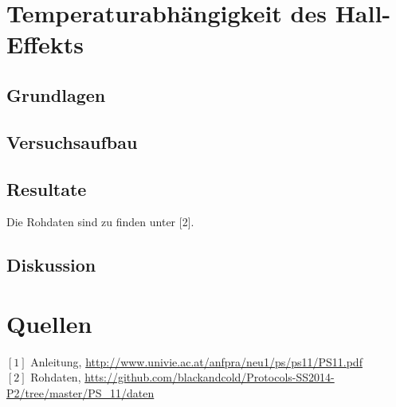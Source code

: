 \documentclass[12pt,a4paper]{article}
\begin{document}
\begin{multicols}{2}
\section{Temperaturabhängigkeit des Hall-Effekts}

\subsection{Grundlagen}

\subsection{Versuchsaufbau}

\subsection{Resultate}


 




\noindent Die Rohdaten sind zu finden unter [2].

\subsection{Diskussion}


\section{Quellen}
$[1]$ Anleitung, \url{http://www.univie.ac.at/anfpra/neu1/ps/ps11/PS11.pdf}\\
$[2]$ Rohdaten, \url{htts://github.com/blackandcold/Protocols-SS2014-P2/tree/master/PS_11/daten}\\

\end{multicols}
\end{document}
